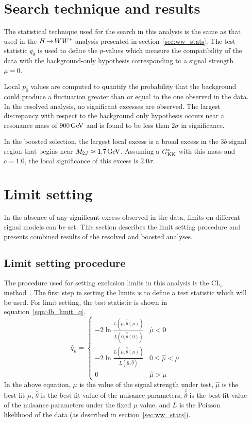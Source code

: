 \section{Search technique and results}

The statistical technique used for the search in this analysis is the same as that used in the $H{\,{\rightarrow}\,}WW^\ast$ analysis presented in section~\ref{sec:ww_stats}. The test statistic $q_0$ is used to define the $p$-values which measure the compatibility of the data with the background-only hypothesis corresponding to a signal strength $\mu = 0$. 

Local $p_0$ values are computed to quantify the probability that the background could produce a fluctuation greater than or equal to the one observed in the data. In the resolved analysis, no significant excesses are observed. The largest discrepancy with respect to the background only hypothesis occurs near a resonance mass of $900 \GeV$ and is found to be less than $2\sigma$ in significance.

In the boosted selection, the largest local excess is a broad excess in the $3b$ signal region that begins near $M_{2J} \approx 1.7 \GeV$. Assuming a $G^*_{\rm KK}$ with this mass and $c=1.0$, the local significance of this excess is $2.0 \sigma$. 

\section{Limit setting}

In the absence of any significant excess observed in the data, limits on different signal models can be set. This section describes the limit setting procedure and presents combined results of the resolved and boosted analyses. 

\subsection{Limit setting procedure}

The procedure used for setting exclusion limits in this analysis is the CL$_{s}$ method~\cite{CLS}. The first step in setting the limits is to define a test statistic which will be used. For limit setting, the test statistic is shown in equation~\ref{eqn:4b_limit_q}. 
%
\begin{equation}
\label{eqn:4b_limit_q}
  \widetilde{q_{\mu}} =
  \begin{cases}
    -2\ln \frac{L(\mu,\hat{\hat{\theta}}(\mu))}{L(0,\hat{\hat{\theta}}(0))} & \hat{\mu} < 0 \\
    -2\ln \frac{L(\mu,\hat{\hat{\theta}}(\mu))}{L(\hat{\mu},\hat{\theta})} & 0 \le \hat{\mu} < \mu \\
    0 & \hat{\mu} > \mu
  \end{cases} 
\end{equation}
%
In the above equation, $\mu$ is the value of the signal strength under test, $\hat{\mu}$ is the best fit $\mu$, $\hat{\theta}$ is the best fit value of the nuisance parameters, $\hat{\hat{\theta}}$ is the best fit value of the nuisance parameters under the fixed $\mu$ value, and $L$ is the Poisson likelihood of the data (as described in section~\ref{sec:ww_stats}). 


